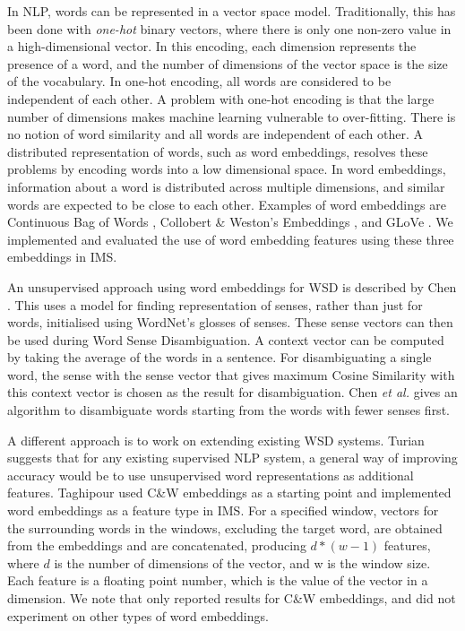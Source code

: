 In NLP, words can be represented in a vector space model. Traditionally, this has been done with {\it one-hot} binary vectors, where there is only one non-zero value in a high-dimensional vector. In this encoding, each dimension represents the presence of a word, and the number of dimensions of the vector space is the size of the vocabulary. In one-hot encoding, all words are considered to be independent of each other. A problem with one-hot encoding is that the large number of dimensions makes machine learning vulnerable to over-fitting. There is no notion of word similarity and all words are independent of each other. A distributed representation of words, such as word embeddings, resolves these problems by encoding words into a low dimensional space. In word embeddings, information about a word is distributed across multiple dimensions, and similar words are expected to be close to each other. Examples of word embeddings are Continuous Bag of Words \cite{mikolovword2vec}, Collobert \& Weston's Embeddings \cite{collobert2008unified}, and GLoVe \cite{pennington2014glove}. We implemented and evaluated the use of word embedding features using these three embeddings in IMS. 


An unsupervised approach using word embeddings for WSD is described by Chen . This uses a model for finding representation of senses, rather than just for words, initialised using WordNet's glosses of senses. These sense vectors can then be used during Word Sense Disambiguation. A context vector can be computed by taking the average of the words in a sentence. For disambiguating a single word, the sense with the sense vector that gives maximum Cosine Similarity with this context vector is chosen as the result for disambiguation. Chen {\it et al.} gives an algorithm to disambiguate words starting from the words with fewer senses first. 

A different approach is to work on extending existing WSD systems. Turian  suggests that for any existing supervised NLP system, a general way of improving accuracy would be to use unsupervised word representations as additional features. Taghipour  used C\&W embeddings as a starting point and implemented word embeddings as a feature type in IMS. For a specified window, vectors for the surrounding words in the windows, excluding the target word, are obtained from the embeddings and are concatenated, producing $d * (w-1)$ features, where $d$ is the number of dimensions of the vector, and w is the window size. Each feature is a floating point number, which is the value of the vector in a dimension. We note that \cite{Taghipour15} only reported results for C\&W embeddings, and did not experiment on other types of word embeddings.  

